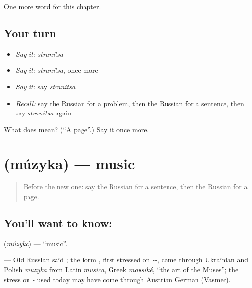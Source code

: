 \begin{grammarlens}[title={What you've built}]
One more word for this chapter.
\end{grammarlens}

\subsection*{Your turn}
\begin{itemize}
\raggedright
  \item \emph{Say it:} \emph{stranítsa}
  \item \emph{Say it:} \emph{stranítsa}, once more
  \item \emph{Say it:} say \emph{stranítsa}
  \item \emph{Recall:} say the Russian for a problem, then the Russian for a sentence, then say \emph{stranítsa} again
\end{itemize}

\begin{tcolorbox}[breakable,colback=teal!4,colframe=teal!35!black,title={Before you move on}]
What does  mean? (\textquotedblleft{}A page\textquotedblright{}.) Say it once more.
\end{tcolorbox}
\section[\texorpdfstring{\ru{музыка} (múzyka)}{музыка (múzyka)}]{ (múzyka) — music}

\label{lesson:RU-C112-music}



\begin{quote}
Before the new one: say the Russian for a sentence, then the Russian for a page.
\end{quote}

\subsection*{You'll want to know: }
\textbf{} (\emph{múzyka}) — \textquotedblleft{}music\textquotedblright{}.

\begin{cousinweb}
\textbf{} — Old Russian said \emph{}; the form \emph{}, first stressed on \emph{--}, came through Ukrainian and Polish \emph{muzyka} from Latin \emph{mūsica}, Greek \emph{mousik\'{\={e}}}, \textquotedblleft{}the art of the Muses\textquotedblright{}; the stress on \emph{-} used today may have come through Austrian German (Vasmer).
\end{cousinweb}

